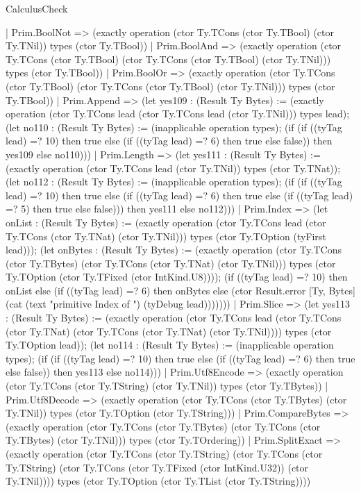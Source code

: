 \begin{lexlean}{CalculusCheck}
\begin{semanticmodule}
{    | Prim.BoolNot => (exactly operation (ctor Ty.TCons (ctor Ty.TBool) (ctor Ty.TNil)) types (ctor Ty.TBool))
    | Prim.BoolAnd => (exactly operation (ctor Ty.TCons (ctor Ty.TBool) (ctor Ty.TCons (ctor Ty.TBool) (ctor Ty.TNil))) types (ctor Ty.TBool))
    | Prim.BoolOr => (exactly operation (ctor Ty.TCons (ctor Ty.TBool) (ctor Ty.TCons (ctor Ty.TBool) (ctor Ty.TNil))) types (ctor Ty.TBool))
    | Prim.Append => (let yes109 : (Result Ty Bytes) := (exactly operation (ctor Ty.TCons lead (ctor Ty.TCons lead (ctor Ty.TNil))) types lead); (let no110 : (Result Ty Bytes) := (inapplicable operation types); (if (if ((tyTag lead) =? 10) then true else (if ((tyTag lead) =? 6) then true else false)) then yes109 else no110)))
    | Prim.Length => (let yes111 : (Result Ty Bytes) := (exactly operation (ctor Ty.TCons lead (ctor Ty.TNil)) types (ctor Ty.TNat)); (let no112 : (Result Ty Bytes) := (inapplicable operation types); (if (if ((tyTag lead) =? 10) then true else (if ((tyTag lead) =? 6) then true else (if ((tyTag lead) =? 5) then true else false))) then yes111 else no112)))
    | Prim.Index => (let onList : (Result Ty Bytes) := (exactly operation (ctor Ty.TCons lead (ctor Ty.TCons (ctor Ty.TNat) (ctor Ty.TNil))) types (ctor Ty.TOption (tyFirst lead))); (let onBytes : (Result Ty Bytes) := (exactly operation (ctor Ty.TCons (ctor Ty.TBytes) (ctor Ty.TCons (ctor Ty.TNat) (ctor Ty.TNil))) types (ctor Ty.TOption (ctor Ty.TFixed (ctor IntKind.U8)))); (if ((tyTag lead) =? 10) then onList else (if ((tyTag lead) =? 6) then onBytes else (ctor Result.error [Ty, Bytes] (cat (text "primitive Index of ") (tyDebug lead)))))))
    | Prim.Slice => (let yes113 : (Result Ty Bytes) := (exactly operation (ctor Ty.TCons lead (ctor Ty.TCons (ctor Ty.TNat) (ctor Ty.TCons (ctor Ty.TNat) (ctor Ty.TNil)))) types (ctor Ty.TOption lead)); (let no114 : (Result Ty Bytes) := (inapplicable operation types); (if (if ((tyTag lead) =? 10) then true else (if ((tyTag lead) =? 6) then true else false)) then yes113 else no114)))
    | Prim.Utf8Encode => (exactly operation (ctor Ty.TCons (ctor Ty.TString) (ctor Ty.TNil)) types (ctor Ty.TBytes))
    | Prim.Utf8Decode => (exactly operation (ctor Ty.TCons (ctor Ty.TBytes) (ctor Ty.TNil)) types (ctor Ty.TOption (ctor Ty.TString)))
    | Prim.CompareBytes => (exactly operation (ctor Ty.TCons (ctor Ty.TBytes) (ctor Ty.TCons (ctor Ty.TBytes) (ctor Ty.TNil))) types (ctor Ty.TOrdering))
    | Prim.SplitExact => (exactly operation (ctor Ty.TCons (ctor Ty.TString) (ctor Ty.TCons (ctor Ty.TString) (ctor Ty.TCons (ctor Ty.TFixed (ctor IntKind.U32)) (ctor Ty.TNil)))) types (ctor Ty.TOption (ctor Ty.TList (ctor Ty.TString))))
}
\end{semanticmodule}
\end{lexlean}
